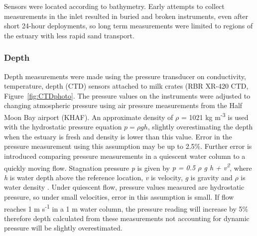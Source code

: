 Sensors were located according to bathymetry. Early attempts to collect measurements in the inlet resulted in buried and broken instruments, even after short 24-hour deployments, so long term measurements were limited to regions of the estuary with less rapid sand transport. 

\subsubsection{Depth} \label{sssec:depth}
Depth measurements were made using the pressure transducer on conductivity, temperature, depth (CTD) sensors
attached to milk crates (RBR XR-420 CTD, Figure~\ref{fig:CTDphoto}. The pressure values on the instruments were adjusted to
changing atmospheric pressure using air pressure measurements from the
Half Moon Bay airport (KHAF). An approximate density of $\rho$ = 1021 kg
m\textsuperscript{-3} is used with the hydrostatic pressure equation ${p
= \rho g h}$, slightly overestimating the depth when the estuary is
fresh and density is lower than this value. Error in the pressure
measurement using this assumption may be up to 2.5\%. Further error is
introduced comparing pressure measurements in a quiescent water column
to a quickly moving flow. Stagnation pressure \emph{p} is given by \emph{p = 0.5
$\rho$ g h +  v\textsuperscript{2}}, where \emph{h} is water depth above the reference location, \emph{v} is velocity, \emph{g} is gravity and \emph{$\rho$} is water density \parencite{young_brief_2004}. Under quiescent flow, pressure values measured are
hydrostatic pressure, so under small velocities, error in this assumption
is small. If flow reaches 1 m s\textsuperscript{-1} in a 1 m water
column, the pressure reading will increase by 5\% therefore depth
calculated from these measurements not accounting for dynamic pressure
will be slightly overestimated.

